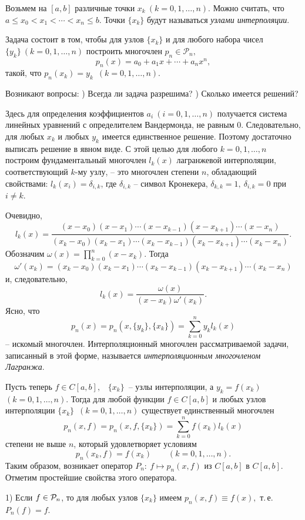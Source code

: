 Возьмем на $[a,b]$ {различные точки} $x_k\ (k=0,1,\ldots,n)$. Можно считать, что
$a \le x_0 <x_1< \cdots <x_n \le b.$ Точки $\{x_k\}$ будут называться {\it узлами
интерполяции}.

Задача состоит в том, чтобы для узлов $\{x_k\}$ и для любого набора {чисел} $\{y_k\}\
(k=0,1,\dots ,n)$ построить многочлен $p_n \in \mathcal{P}_n,$
\[
  p_n(x)=a_0+a_1x+\cdots +a_n x^n,
\]
такой, что $p_n(x_k)=y_k$\  $(k=0,1,\dots ,n).$

Возникают вопросы:
) Всегда ли задача разрешима?
) Сколько имеется решений?
\smallskip

Здесь для определения коэффициентов $a_i\ (i=0,1,\dots,n)$ получается система линейных
уравнений с определителем Вандермонда, не равным $0.$ Следовательно, для любых $x_k$ и
любых $y_k$ имеется единственное решение. Поэтому достаточно {выписать} решение в
явном виде. {С этой целью для} любого $k=0,1,\dots,n$ построим фундаментальный
многочлен {$l_k(x)$} лагранжевой интерполяции, соответствующий $k$-му узлу, -- это
многочлен степени $n$, обладающий свойствами: $l_k(x_i)=\delta_{i,k}$, где
$\delta_{i,k}$ -- символ Кронекера, $\delta_{k,k}=1, \ \delta_{i,k}=0$ при $i \ne k$.

Очевидно,
\[
  l_k(x)=\frac{(x-x_0)(x-x_1)\cdots (x-x_{k-1})(x-x_{k+1})\cdots (x-x_n)}
         {(x_k-x_0)(x_k-x_1)\cdots (x_k-x_{k-1})(x_k-x_{k+1})\cdots (x_k-x_n)}.
\]
Обозначим $\omega(x)=\prod_{k=0}^n(x-x_k).$
Тогда
$$
\omega'(x_k)=
      (x_k-x_0)(x_k-x_1)\cdots (x_k-x_{k-1})(x_k-x_{k+1})\cdots (x_k-x_n)
$$
и, следовательно,
\[
 l_k(x)=\frac{\omega(x)}{(x-x_k)\omega'(x_k)}.
\]
Ясно, что
\[
 p_n(x)=p_{n}(x,\{y_k\},\{x_k\})=
 \sum\limits_{k=0}^n y_k l_k(x)
\]
-- искомый многочлен. Интерполяционный многочлен
рассматриваемой задачи, записанный в этой форме, называется {\it
интерполяционным многочленом Лагранжа}.

Пусть теперь $f \in C[a,b],$~ $\{x_k\}$~-- узлы интерполяции, а $y_k=f(x_k)$\
$(k=0,1,\dots ,n).$ Тогда для любой функции $f \in C[a,b]$ и любых узлов
{интерполяции} $\{x_k\}$\  $(k=0,1,\dots ,n)$ существует единственный многочлен
$$
p_n(x,f)=p_n(x,f,\{x_k\})=\sum\limits_{k=0}^n f(x_k) l_k(x)
$$
степени не выше $n$, который удовлетворяет условиям
\[
 p_n(x_k,f)=f(x_k)\qquad (k=0,1,\dots ,n).
\]
Таким образом, возникает {оператор} $P_n:\ f \longmapsto p_n(x,f)$ {из} $C{[a,
b]}$ в $C{[a,b]}$. {Отметим} простейшие свойства {этого оператора.}

1) {Если} $f \in \mathcal{P}_n$, то для любых узлов $\{x_k\}$
имеем $p_n(x,f)\equiv f(x),$ т.\,е. $P_{n}(f)=f.$

